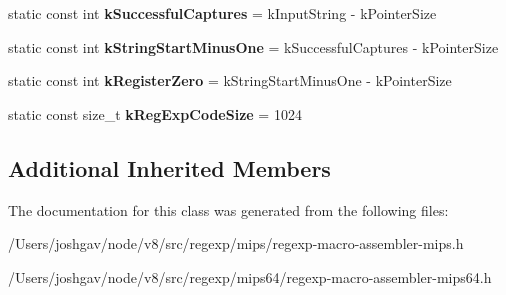 \begin{DoxyCompactItemize}
\item 
static const int {\bfseries k\+Successful\+Captures} = k\+Input\+String -\/ k\+Pointer\+Size\hypertarget{classv8_1_1internal_1_1_reg_exp_macro_assembler_m_i_p_s_a856c46f8a9ea6aee2a39646a2b3fd039}{}\label{classv8_1_1internal_1_1_reg_exp_macro_assembler_m_i_p_s_a856c46f8a9ea6aee2a39646a2b3fd039}

\item 
static const int {\bfseries k\+String\+Start\+Minus\+One} = k\+Successful\+Captures -\/ k\+Pointer\+Size\hypertarget{classv8_1_1internal_1_1_reg_exp_macro_assembler_m_i_p_s_a1118b67891ea94c8d097e2fc21fa775b}{}\label{classv8_1_1internal_1_1_reg_exp_macro_assembler_m_i_p_s_a1118b67891ea94c8d097e2fc21fa775b}

\item 
static const int {\bfseries k\+Register\+Zero} = k\+String\+Start\+Minus\+One -\/ k\+Pointer\+Size\hypertarget{classv8_1_1internal_1_1_reg_exp_macro_assembler_m_i_p_s_a4c5ae9d45a38a852c13a442a55eaa990}{}\label{classv8_1_1internal_1_1_reg_exp_macro_assembler_m_i_p_s_a4c5ae9d45a38a852c13a442a55eaa990}

\item 
static const size\+\_\+t {\bfseries k\+Reg\+Exp\+Code\+Size} = 1024\hypertarget{classv8_1_1internal_1_1_reg_exp_macro_assembler_m_i_p_s_abd9b292e8fc49719f9de846545b799a6}{}\label{classv8_1_1internal_1_1_reg_exp_macro_assembler_m_i_p_s_abd9b292e8fc49719f9de846545b799a6}

\end{DoxyCompactItemize}
\subsection*{Additional Inherited Members}


The documentation for this class was generated from the following files\+:\begin{DoxyCompactItemize}
\item 
/\+Users/joshgav/node/v8/src/regexp/mips/regexp-\/macro-\/assembler-\/mips.\+h\item 
/\+Users/joshgav/node/v8/src/regexp/mips64/regexp-\/macro-\/assembler-\/mips64.\+h\end{DoxyCompactItemize}
